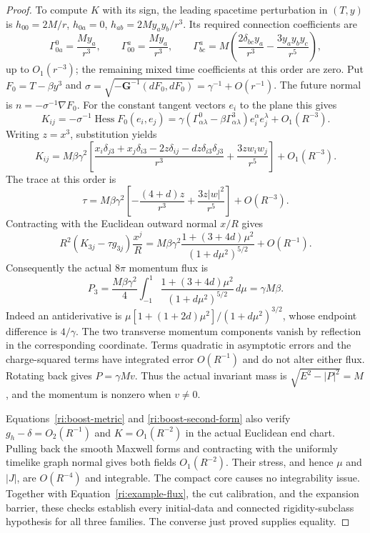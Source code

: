 \begin{proof}
To compute $K$ with its sign, the leading spacetime perturbation
in $(T,y)$ is $h_{00}=2M/r$, $h_{0a}=0$,
$h_{ab}=2My_ay_b/r^3$.  Its required connection coefficients are
\[
 \Gamma^0_{0a}=\frac{My_a}{r^3},\qquad
 \Gamma^a_{00}=\frac{My_a}{r^3},\qquad
 \Gamma^a_{bc}
   =M\left(\frac{2\delta_{bc}y_a}{r^3}
                     -\frac{3y_ay_by_c}{r^5}\right),
\]
up to $O_1(r^{-3})$; the remaining mixed time coefficients at
this order are zero.  Put $F_0=T-\beta y^3$ and
$\sigma=\sqrt{-\mathbf G^{-1}(dF_0,dF_0)}
=\gamma^{-1}+O(r^{-1})$.  The future normal is
$n=-\sigma^{-1}\nabla F_0$.  For the constant tangent vectors
$e_i$ to the plane this gives
\[
 K_{ij}=-\sigma^{-1}\operatorname{Hess}F_0(e_i,e_j)
  =\gamma(\Gamma^0_{\alpha\lambda}-\beta\Gamma^3_{\alpha\lambda})e_i^\alpha e_j^\lambda
       +O_1(R^{-3}).
\]
Writing $z=x^3$, substitution yields
\begin{equation}
\label{ri:boost-second-form}
 K_{ij}=M\beta\gamma^2
 \left[
  \frac{x_i\delta_{j3}+x_j\delta_{i3}
                    -2z\delta_{ij}-dz\delta_{i3}\delta_{j3}}{r^3}
       +\frac{3zw_iw_j}{r^5}
 \right]+O_1(R^{-3}).
\end{equation}
The trace at this order is
\[
 \tau=M\beta\gamma^2
       \left[-\frac{(4+d)z}{r^3}+\frac{3z|w|^2}{r^5}\right]
                +O(R^{-3}).
\]
Contracting with the Euclidean outward normal $x/R$ gives
\[
 R^2(K_{3j}-\tau g_{3j})\frac{x^j}{R}
  =M\beta\gamma^2
     \frac{1+(3+4d)\mu^2}{(1+d\mu^2)^{5/2}}+O(R^{-1}).
\]
Consequently the actual $8\pi$ momentum flux is
\begin{equation}
\label{ri:boost-momentum}
 P_3=\frac{M\beta\gamma^2}{4}
      \int_{-1}^1\frac{1+(3+4d)\mu^2}{(1+d\mu^2)^{5/2}}\,d\mu
      =\gamma M\beta.
\end{equation}
Indeed an antiderivative is
$\mu[1+(1+2d)\mu^2]/(1+d\mu^2)^{3/2}$, whose endpoint
difference is $4/\gamma$.  The two transverse momentum
components vanish by reflection in the corresponding
coordinate.  Terms quadratic in asymptotic errors and the
charge-squared terms have integrated error $O(R^{-1})$ and do
not alter either flux.  Rotating back gives $P=\gamma Mv$.
Thus the actual invariant mass is
$\sqrt{E^2-|P|^2}=M$, and the momentum is nonzero when $v\ne0$.

Equations~\eqref{ri:boost-metric} and
\eqref{ri:boost-second-form} also verify
$g_h-\delta=O_2(R^{-1})$ and $K=O_1(R^{-2})$ in the actual
Euclidean end chart.  Pulling back the smooth Maxwell forms
and contracting with the uniformly timelike graph normal
gives both fields $O_1(R^{-2})$.  Their stress, and hence
$\mu$ and $|J|$, are $O(R^{-4})$ and integrable.  The compact
core causes no integrability issue.  Together with
Equation~\eqref{ri:example-flux}, the cut calibration, and the
expansion barrier, these checks establish every initial-data
and connected rigidity-subclass hypothesis for all three
families.  The converse just proved supplies equality.
\end{proof}
